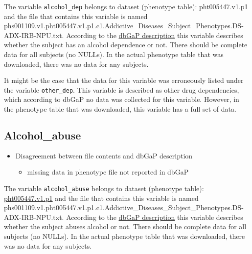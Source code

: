 \documentclass[11pt]{article}
\providecommand{\tightlist}{%
      \setlength{\itemsep}{0pt}\setlength{\parskip}{0pt}}
\begin{document}
The variable \texttt{alcohol\_dep} belongs to dataset (phenotype table):
\href{https://www.ncbi.nlm.nih.gov/projects/gap/cgi-bin/dataset.cgi?study_id=phs001109.v1.p1\&phv=261905\&phd=6837\&pha=\&pht=5447\&phvf=1\&phdf=\&phaf=\&phtf=1\&dssp=1\&consent=\&temp=1}{pht005447.v1.p1}
and the file that contains this variable is named
phs001109.v1.pht005447.v1.p1.c1.Addictive\_Diseases\_Subject\_Phenotypes.DS-ADX-IRB-NPU.txt.
According to the
\href{https://www.ncbi.nlm.nih.gov/projects/gap/cgi-bin/variable.cgi?study_id=phs001109.v1.p1\&phv=261907\&phd=6837\&pha=\&pht=5447\&phvf=1\&phdf=\&phaf=\&phtf=1\&dssp=1\&consent=\&temp=1}{dbGaP
description} this variable describes whether the subject has an alcohol
dependence or not. There should be complete data for all subjects (no
NULLs). In the actual phenotype table that was downloaded, there was no
data for any subjects.

It might be the case that the data for this variable was erroneously
listed under the variable \texttt{other\_dep}. This variable is
described as other drug dependencies, which according to dbGaP no data
was collected for this variable. However, in the phenotype table that
was downloaded, this variable has a full set of data.

    \subsection{Alcohol\_abuse}\label{alcohol_abuse}

\begin{itemize}
\tightlist
\item
  Disagreement between file contents and dbGaP description

  \begin{itemize}
  \tightlist
  \item
    missing data in phenotype file not reported in dbGaP
  \end{itemize}
\end{itemize}

The variable \texttt{alcohol\_abuse} belongs to dataset (phenotype
table):
\href{https://www.ncbi.nlm.nih.gov/projects/gap/cgi-bin/dataset.cgi?study_id=phs001109.v1.p1\&phv=261905\&phd=6837\&pha=\&pht=5447\&phvf=1\&phdf=\&phaf=\&phtf=1\&dssp=1\&consent=\&temp=1}{pht005447.v1.p1}
and the file that contains this variable is named
phs001109.v1.pht005447.v1.p1.c1.Addictive\_Diseases\_Subject\_Phenotypes.DS-ADX-IRB-NPU.txt.
According to the
\href{https://www.ncbi.nlm.nih.gov/projects/gap/cgi-bin/variable.cgi?study_id=phs001109.v1.p1\&phv=261907\&phd=6837\&pha=\&pht=5447\&phvf=1\&phdf=\&phaf=\&phtf=1\&dssp=1\&consent=\&temp=1}{dbGaP
description} this variable describes whether the subject abuses alcohol
or not. There should be complete data for all subjects (no NULLs). In
the actual phenotype table that was downloaded, there was no data for
any subjects.
\end{document}
